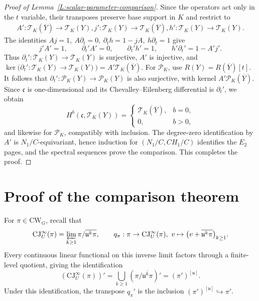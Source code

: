 \documentclass[a4paper,12pt]{amsart}
\numberwithin{equation}{section}
\theoremstyle{plain}
\theoremstyle{definition}
\theoremstyle{remark}
\begin{document}
\begin{proof}[Proof of Lemma~\ref{L:scalar-parameter-comparison}]
Since the operators act only in the $t$ variable, their transposes preserve base support in $K$ and restrict to
\[
\begin{aligned}
 A':\mathcal T_K(\overline Y)\longrightarrow\mathcal T_K(Y),
 j':\mathcal T_K(Y)\longrightarrow\mathcal T_K(\overline Y),
 h':\mathcal T_K(Y)\longrightarrow\mathcal T_K(Y).
\end{aligned}
\]
The identities $Aj=1,\ A\partial_t=0,\ \partial_t h=1-jA,\ h\partial_t=1$ give
\[
 j'A'=1,\qquad \partial_t'A'=0,\qquad \partial_t'h'=1,\qquad h'\partial_t'=1-A'j'.
\]
Thus $\partial_t':\mathcal T_K(Y)\to\mathcal T_K(Y)$ is surjective, $A'$ is injective, and $\ker\bigl(\partial_t':\mathcal T_K(Y)\to\mathcal T_K(Y)\bigr)=A'\mathcal T_K(\overline Y)$.
For $\mathcal P_K$, use $R(Y)=R(\overline Y)[t]$.
It follows that $\partial_t':\mathcal P_K(Y)\to\mathcal P_K(Y)$ is also surjective, with kernel $A'\mathcal P_K(\overline Y)$.
Since $\mathfrak c$ is one-dimensional and its Chevalley--Eilenberg differential is $\partial_t'$, we obtain
\[
 H^b(\mathfrak c,\mathcal T_K(Y))=
 \begin{cases}\mathcal T_K(\overline Y),&b=0,\\0,&b>0,\end{cases}
\]
and likewise for $\mathcal P_K$, compatibly with inclusion.
The degree-zero identification by $A'$ is $N_1/C$-equivariant, hence induction for $(N_1/C,CH_1/C)$ identifies the $E_2$ pages, and the spectral sequences prove the comparison.
This completes the proof.
\end{proof}

\section{Proof of the comparison theorem}\label{S:conclusion}

For $\pi\in\mathrm{CW}_G$, recall that
\[
 \mathrm{CJ}^{\infty}_U(\pi)=\varprojlim_{k\geq1}\pi/\overline{\mathfrak u^k\pi},
 \qquad
 q_\pi: \pi\to \mathrm{CJ}^{\infty}_U(\pi),\  v\mapsto\bigl(v+\overline{\mathfrak u^k\pi}\bigr)_{k\geq1}.
\]
Every continuous linear functional on this inverse limit factors through a finite-level quotient, giving the identification
\begin{equation}\label{dual iso}
 (\mathrm{CJ}^{\infty}_U(\pi))'
 =\bigcup_{k\geq1}(\pi/\overline{\mathfrak u^k\pi})'
 =(\pi')^{[\mathfrak u]}.
\end{equation}
Under this identification, the transpose $q_\pi'$ is the inclusion $(\pi')^{[\mathfrak u]}\hookrightarrow\pi'$.
\end{document}
